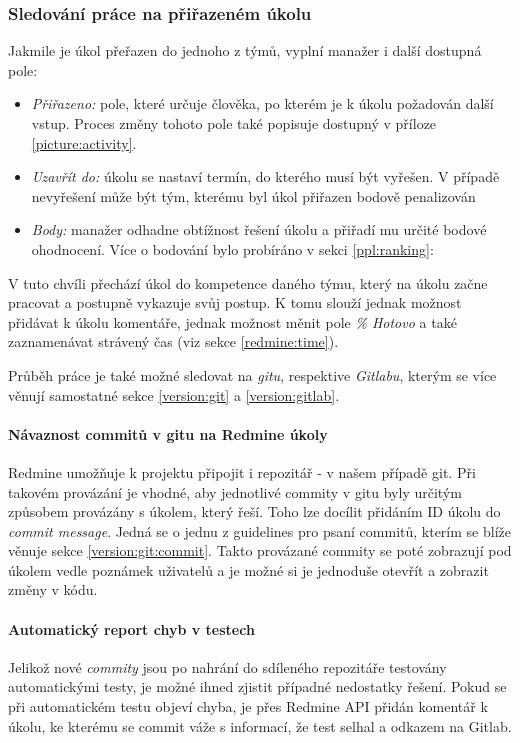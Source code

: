 \subsubsection{Sledování práce na přiřazeném úkolu}

Jakmile je úkol přeřazen do jednoho z týmů, vyplní manažer i další dostupná pole:
\begin{itemize}
	\item \emph{Přiřazeno:} pole, které určuje člověka, po kterém je k úkolu požadován další vstup. Proces změny tohoto pole také popisuje  dostupný v příloze \ref{picture:activity}.
	\item \emph{Uzavřít do:} úkolu se nastaví termín, do kterého musí být vyřešen. V případě nevyřešení může být tým, kterému byl úkol přiřazen bodově penalizován
	\item \emph{Body:} manažer odhadne obtížnost řešení úkolu a přiřadí mu určité bodové ohodnocení. Více o bodování bylo probíráno v sekci \ref{ppl:ranking}: 
\end{itemize}

V tuto chvíli přechází úkol do kompetence daného týmu, který na úkolu začne pracovat a postupně vykazuje svůj postup. K tomu slouží jednak možnost přidávat k úkolu komentáře, jednak možnost měnit pole \emph{\% Hotovo} a také zaznamenávat strávený čas (viz sekce \ref{redmine:time}).

Průběh práce je také možné sledovat na \emph{gitu}, respektive \emph{Gitlabu}, kterým se více věnují samostatné sekce \ref{version:git} a \ref{version:gitlab}.

\paragraph{Návaznost commitů v gitu na Redmine úkoly} \label{redmine:commitlink}
Redmine umožňuje k projektu připojit i repozitář - v našem případě git. Při takovém provázání je vhodné, aby jednotlivé commity v gitu byly určitým způsobem provázány s úkolem, který řeší. Toho lze docílit přidáním ID úkolu do \emph{commit message}. Jedná se o jednu z guidelines pro psaní commitů, kterím se blíže věnuje sekce \ref{version:git:commit}. Takto provázané commity se poté zobrazují pod úkolem vedle poznámek uživatelů a je možné si je jednoduše otevřít a zobrazit změny v kódu.

\paragraph{Automatický report chyb v testech}
Jelikož nové \emph{commity} jsou po nahrání do sdíleného repozitáře testovány automatickými testy, je možné ihned zjistit případné nedostatky řešení. Pokud se při automatickém testu objeví chyba, je přes Redmine API přidán komentář k úkolu, ke kterému se commit váže s informací, že test selhal a odkazem na Gitlab.

